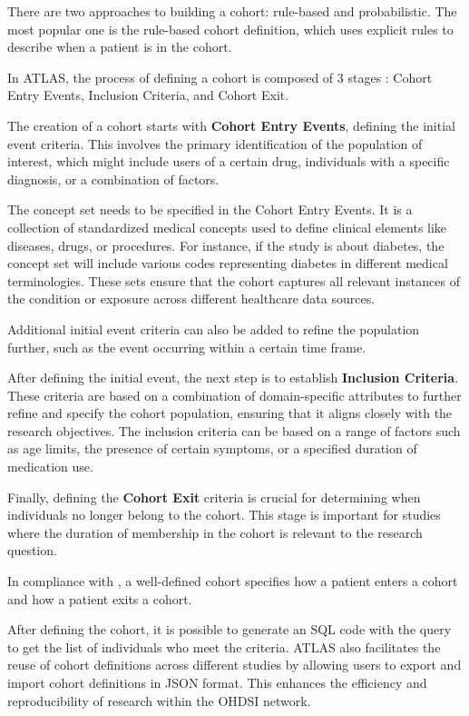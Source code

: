 There are two approaches to building a cohort: rule-based and probabilistic. The most popular one is the rule-based cohort definition, which uses explicit rules to describe when a patient is in the cohort.

In ATLAS, the process of defining a cohort is composed of 3 stages \cite{informatics_chapter_nodate}: Cohort Entry Events, Inclusion Criteria, and Cohort Exit.

The creation of a cohort starts with \textbf{Cohort Entry Events}, defining the initial event criteria. This involves the primary identification of the population of interest, which might include users of a certain drug, individuals with a specific diagnosis, or a combination of factors. 

The concept set needs to be specified in the Cohort Entry Events. It is a collection of standardized medical concepts used to define clinical elements like diseases, drugs, or procedures. For instance, if the study is about diabetes, the concept set will include various codes representing diabetes in different medical terminologies. These sets ensure that the cohort captures all relevant instances of the condition or exposure across different healthcare data sources.

Additional initial event criteria can also be added to refine the population further, such as the event occurring within a certain time frame.

After defining the initial event, the next step is to establish \textbf{Inclusion Criteria}. These criteria are based on a combination of domain-specific attributes to further refine and specify the cohort population, ensuring that it aligns closely with the research objectives. The inclusion criteria can be based on a range of factors such as age limits, the presence of certain symptoms, or a specified duration of medication use.

Finally, defining the \textbf{Cohort Exit} criteria is crucial for determining when individuals no longer belong to the cohort. This stage is important for studies where the duration of membership in the cohort is relevant to the research question.

In compliance with \citet{informatics_chapter_nodate}, a well-defined cohort specifies how a patient enters a cohort and how a patient exits a cohort.

After defining the cohort, it is possible to generate an SQL code with the query to get the list of individuals who meet the criteria. ATLAS also facilitates the reuse of cohort definitions across different studies by allowing users to export and import cohort definitions in JSON format. This enhances the efficiency and reproducibility of research within the OHDSI network.

